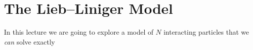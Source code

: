 \section{The Lieb--Liniger Model}

In this lecture we are going to explore a model of $N$ interacting particles that we \emph{can} solve exactly

